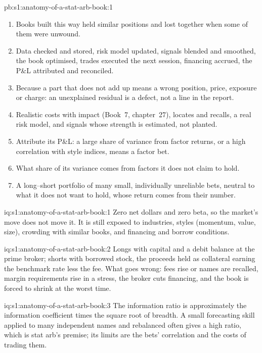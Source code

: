 \begin{solution}{pb:s1:anatomy-of-a-stat-arb-book:1}
\begin{enumerate}
\item Books built this way held similar positions and lost together when some of them were unwound.
\item Data checked and stored, risk model updated, signals blended and smoothed, the book optimised, trades executed the next session, financing accrued, the P\&L
attributed and reconciled.
\item Because a part that does not add up means a wrong position, price, exposure or charge: an unexplained residual is a defect, not a line in the report.
\item Realistic costs with impact (Book~7, chapter~27), locates and recalls, a real risk model, and signals whose strength is estimated, not planted.
\item Attribute its P\&L: a large share of variance from factor returns, or a high correlation with style indices, means a factor bet.
\item What share of its variance comes from factors it does not claim to hold.
\item A long--short portfolio of many small, individually unreliable bets, neutral to what it does not want to hold, whose return comes from their number.
\end{enumerate}
\end{solution}

\begin{solution}{iq:s1:anatomy-of-a-stat-arb-book:1}
Zero net dollars and zero beta, so the market's move does not move it. It is still exposed to industries, styles (momentum, value, size), crowding with similar
books, and financing and borrow conditions.
\end{solution}

\begin{solution}{iq:s1:anatomy-of-a-stat-arb-book:2}
Longs with capital and a debit balance at the prime broker; shorts with borrowed stock, the proceeds held as collateral earning the benchmark rate less the fee.
What goes wrong: fees rise or names are recalled, margin requirements rise in a stress, the broker cuts financing, and the book is forced to shrink at the worst
time.
\end{solution}

\begin{solution}{iq:s1:anatomy-of-a-stat-arb-book:3}
The information ratio is approximately the information coefficient times the square root of breadth. A small forecasting skill applied to many independent
names and rebalanced often gives a high ratio, which is stat arb's premise; its limits are the bets' correlation and the costs of trading them.
\end{solution}

